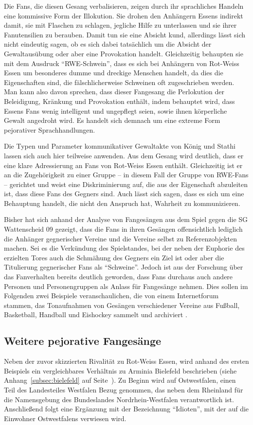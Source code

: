 Die Fans, die diesen Gesang verbalisieren, zeigen durch ihr sprachliches Handeln eine kommissive Form der Illokution.
Sie drohen den Anhängern Essens indirekt damit, sie mit Flaschen zu schlagen, jegliche Hilfe zu unterlassen und sie ihrer Fanutensilien zu berauben.
Damit tun sie eine Absicht kund, allerdings lässt sich nicht eindeutig sagen, ob es sich dabei tatsächlich um die Absicht der Gewaltausübung oder aber eine Provokation handelt.
Gleichzeitig behaupten sie mit dem Ausdruck "`RWE-Schwein"', dass es sich bei Anhängern von Rot-Weiss Essen um besonderes dumme und dreckige Menschen handelt, da dies die Eigenschaften sind, die fälschlicherweise Schweinen oft zugeschrieben werden.
Man kann also davon sprechen, dass dieser Fangesang die Perlokution der Beleidigung, Kränkung und Provokation enthält, indem behauptet wird, dass Essens Fans wenig intelligent und ungepflegt seien, sowie ihnen körperliche Gewalt angedroht wird.
Es handelt sich demnach um eine extreme Form pejorativer Sprachhandlungen.

Die Typen und Parameter kommunikativer Gewaltakte von König und Stathi \cite[S. 50]{EK10} lassen sich auch hier teilweise anwenden.
Aus dem Gesang wird deutlich, dass er eine klare Adressierung an Fans von Rot-Weiss Essen enthält.
Gleichzeitig ist er an die Zugehörigkeit zu einer Gruppe – in diesem Fall der Gruppe von RWE-Fans – gerichtet und weist eine Diskriminierung auf, die aus der Eigenschaft abzuleiten ist, dass diese Fans des Gegners sind.
Auch lässt sich sagen, dass es sich um eine Behauptung handelt, die nicht den Anspruch hat, Wahrheit zu kommunizieren.

Bisher hat sich anhand der Analyse von Fangesängen aus dem Spiel gegen die SG Wattenscheid 09 gezeigt, dass die Fans in ihren Gesängen offensichtlich lediglich die Anhänger gegnerischer Vereine und die Vereine selbst zu Referenzobjekten machen.
Sei es die Verkündung des Spielstandes, bei der neben der Euphorie des erzielten Tores auch die Schmähung des Gegners ein Ziel ist oder aber die Titulierung gegnerischer Fans als "`Schweine"'.
Jedoch ist aus der Forschung über das Fanverhalten bereits deutlich geworden, dass Fans durchaus auch andere Personen und Personengruppen als Anlass für Fangesänge nehmen.
Dies sollen im Folgenden zwei Beispiele veranschaulichen, die von einem Internetforum stammen, das Tonaufnahmen von Gesängen verschiedener Vereine aus Fußball, Basketball, Handball und Eishockey sammelt und archiviert \cite{BT14}.

\subsection{Weitere pejorative Fangesänge}
Neben der zuvor skizzierten Rivalität zu Rot-Weiss Essen, wird anhand des ersten Beispiels ein vergleichbares Verhältnis zu Arminia Bielefeld beschrieben (siehe Anhang~\ref{subsec:bielefeld} auf Seite~\pageref{subsec:bielefeld}).
Zu Beginn wird auf Ostwestfalen, einen Teil des Landesteiles Westfalen Bezug genommen, das neben dem Rheinland für die Namensgebung des Bundeslandes Nordrhein-Westfalen verantwortlich ist.
Anschließend folgt eine Ergänzung mit der Bezeichnung "`Idioten"', mit der auf die Einwohner Ostwestfalens verwiesen wird.

